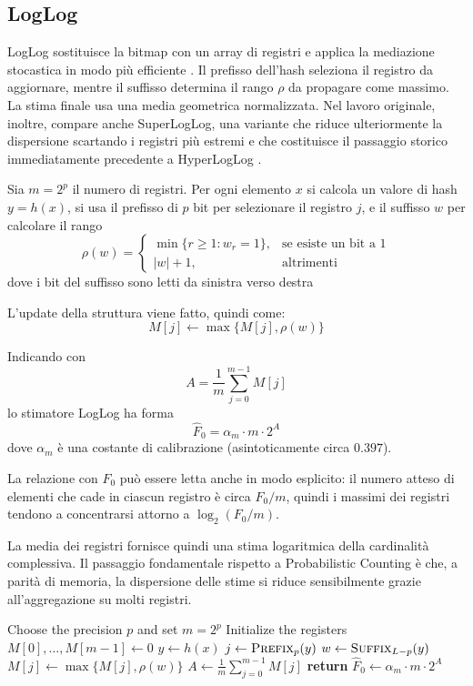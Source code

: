 \subsection{LogLog}
LogLog sostituisce la bitmap con un array di registri e applica la mediazione
stocastica in modo più efficiente \cite{Durand_Flajolet_2003}. Il prefisso
dell'hash seleziona il registro da aggiornare, mentre il suffisso determina il
rango $\rho$ da propagare come massimo. La stima finale usa una media geometrica normalizzata.
Nel lavoro originale, inoltre, compare anche SuperLogLog, una variante che
riduce ulteriormente la dispersione scartando i registri più estremi e che
costituisce il passaggio storico immediatamente precedente a HyperLogLog
\cite{Durand_Flajolet_2003}.

\begin{definition}[LogLog]
Sia $m=2^p$ il numero di registri. Per ogni elemento $x$ si calcola un valore
di hash $y=h(x)$, si usa il prefisso di $p$ bit per selezionare il registro
\(j\), e il suffisso \(w\) per calcolare il rango
\[
\rho(w)=
\begin{cases}
\min\{r\geq 1 : w_r=1\}, & \text{se esiste un bit a }1 \\[1mm]
|w|+1, & \text{altrimenti}
\end{cases}
\]
dove i bit del suffisso sono letti da sinistra verso destra

L'update della struttura viene fatto, quindi come:
\[
M[j] \leftarrow \max\{M[j],\rho(w)\}
\]

Indicando con
\[
A=\frac{1}{m}\sum_{j=0}^{m-1} M[j]
\]
lo stimatore LogLog ha forma
\[
\hat{F}_0 = \alpha_m \cdot m \cdot 2^{A}
\]
dove $\alpha_m$ è una costante di calibrazione (asintoticamente circa $0.397$).
\end{definition}

La relazione con $F_0$ può essere letta anche in modo esplicito: il numero
atteso di elementi che cade in ciascun registro è circa $F_0/m$, quindi i
massimi dei registri tendono a concentrarsi attorno a $\log_2(F_0/m)$.

La media dei registri fornisce quindi una stima logaritmica della cardinalità complessiva. Il passaggio 
fondamentale rispetto a Probabilistic Counting è che, a parità di memoria, la dispersione delle stime
si riduce sensibilmente grazie all'aggregazione su molti registri.

\begin{algorithm}[htbp]
    \caption{LogLog}
    \label{alg:loglog}
    \begin{algorithmic}
        \STATE Choose the precision $p$ and set $m=2^p$
        \STATE Initialize the registers $M[0],\dots,M[m-1]\leftarrow 0$
            \STATE $y \leftarrow h(x)$
            \STATE $j \leftarrow \textsc{Prefix}_p(y)$
            \STATE $w \leftarrow \textsc{Suffix}_{L-p}(y)$
            \STATE $M[j] \leftarrow \max\{M[j],\rho(w)\}$
        \ENDFOR
        \STATE $A \leftarrow \frac{1}{m}\sum_{j=0}^{m-1} M[j]$
        \STATE \textbf{return} $\hat{F}_0 \leftarrow \alpha_m \cdot m \cdot 2^A$
    \end{algorithmic}
\end{algorithm}

